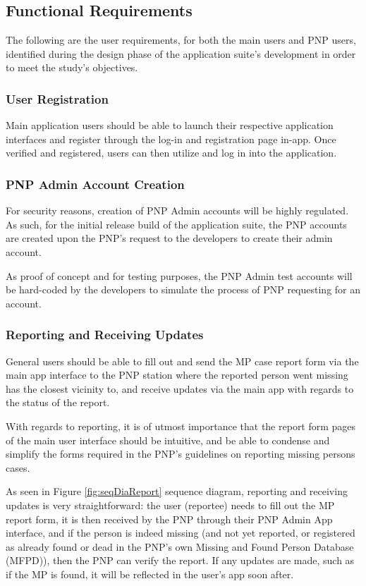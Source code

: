 \subsection{Functional Requirements}

The following are the user requirements, for both the main users and PNP users, identified during the design phase of the application suite's development in order to meet the study's objectives. 

\subsubsection{User Registration}
Main application users should be able to launch their respective application interfaces and register through the log-in and registration page in-app. Once verified and registered, users can then utilize and log in into the application. 

\subsubsection{PNP Admin Account Creation}

For security reasons, creation of PNP Admin accounts will be highly regulated. As such, for the initial release build of the application suite, the PNP accounts are created upon the PNP's request to the developers to create their admin account.

As proof of concept and for testing purposes, the PNP Admin test accounts will be hard-coded by the developers to simulate the process of PNP requesting for an account. 


\subsubsection{Reporting and Receiving Updates}
General users should be able to fill out and send the MP case report form via the main app interface to the PNP station where the reported person went missing has the closest vicinity to, and receive updates via the main app with regards to the status of the report.

With regards to reporting, it is of utmost importance that the report form pages of the main user interface should be intuitive, and be able to condense and simplify the forms required in the PNP's guidelines on reporting missing persons cases.

As seen in Figure \ref{fig:seqDiaReport} sequence diagram, reporting and receiving updates is very straightforward: the user (reportee) needs to fill out the MP report form, it is then received by the PNP through their PNP Admin App interface, and if the person is indeed missing (and not yet reported, or registered as already found or dead in the PNP's own Missing and Found Person Database (MFPD)), then the PNP can verify the report. If any updates are made, such as if the MP is found, it will be reflected in the user’s app soon after.

